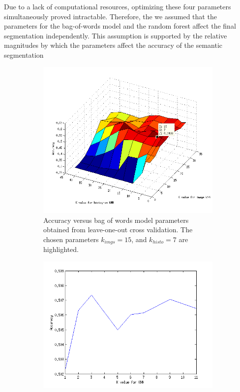 \documentclass{article} %
\begin{document}
Due to a lack of computational resources, optimizing these four parameters simultaneously proved intractable. Therefore, the we assumed that the parameters for the bag-of-words model and the random forest affect the final segmentation independently. This assumption is supported by the relative magnitudes by which the parameters affect the accuracy of the semantic segmentation

\begin{figure}[htb]
\centering
	\begin{subfigure}[t]{0.33\textwidth}
		\centering
		\includegraphics[width = \textwidth]{./img/pickK_final}
		\parbox{.95\textwidth}{\caption{Accuracy versus bag of words model parameters obtained from leave-one-out cross validation. The chosen parameters $k_{imgs} = 15$, and $k_{histo} = 7$ are highlighted. \label{fig:Kbag} }}
			\end{subfigure}
	\begin{subfigure}[t]{0.33\textwidth}
		\centering
		\includegraphics[width = \textwidth]{./img/kforest}

\end{subfigure}
\end{figure}
\end{document}

